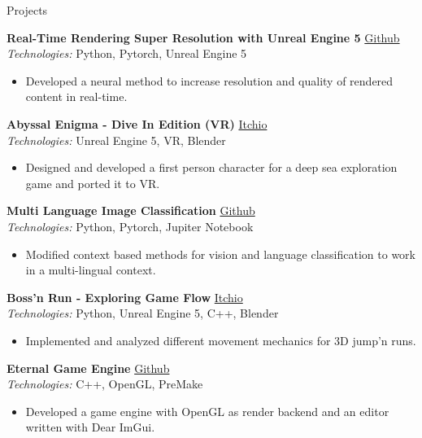 \documentclass{resume} %
\begin{document}
\begin{rSection}{Projects}
{\small
{\bf Real-Time Rendering Super Resolution with Unreal Engine 5} \hfill {\href{https://github.com/BrandnerKasper/URTSR}{Github}} \\
{\small {\em Technologies:} Python, Pytorch, Unreal Engine 5}
\begin{itemize}
    \item \small Developed a neural method to increase resolution and quality of rendered content in real-time.
\end{itemize}
}
{\small
{\bf Abyssal Enigma - Dive In Edition (VR)} \hfill {\href{https://miggli.itch.io/abyssal-enigma/devlog/638746/abyssal-engima-dive-in-edition-vr}{Itchio}} \\
{\small {\em Technologies:} Unreal Engine 5, VR, Blender}
\begin{itemize}
   \item \small Designed and developed a first person character for a deep sea exploration game and ported it to VR.
\end{itemize}
}

{\small
{\bf Multi Language Image Classification} \hfill {\href{https://github.com/BrandnerKasper/MP_CustomCoOp}{Github}} \\
{\small {\em Technologies:} Python, Pytorch, Jupiter Notebook}
\begin{itemize}
    \item \small Modified context based methods for vision and language classification to work in a multi-lingual context.
\end{itemize}
}

{\bf Boss'n Run - Exploring Game Flow} \hfill {\href{https://brandnerkasper.itch.io/bossn-run}{Itchio}} \\
{\small {\em Technologies:} Python, Unreal Engine 5, C++, Blender}
\begin{itemize}
   \item \small Implemented and analyzed different movement mechanics for 3D jump'n runs.
\end{itemize}


{\bf Eternal Game Engine} \hfill {\href{https://github.com/BrandnerKasper/Eternal}{Github}} \\
{\small {\em Technologies:} C++, OpenGL, PreMake}
\begin{itemize}
   \item \small Developed a game engine with OpenGL as render backend and an editor written with Dear ImGui.
\end{itemize}


\end{rSection}
\end{document}
